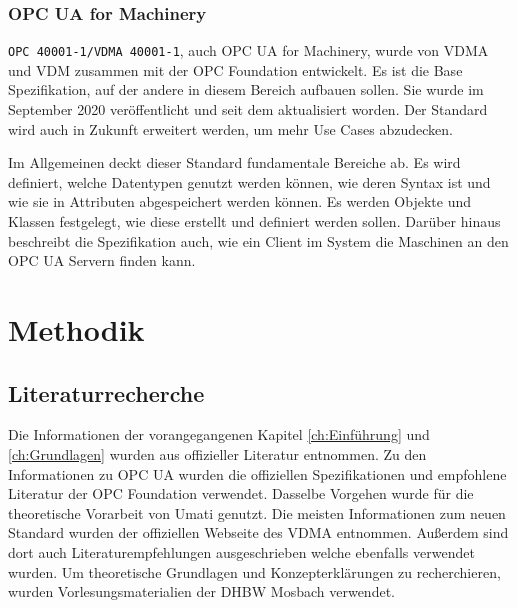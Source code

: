 \documentclass[a4paper, 12pt, oneside]{scrbook}
\begin{document}
		\subsection{OPC UA for Machinery}
		
		\texttt{OPC 40001-1/VDMA 40001-1}, auch OPC UA for Machinery, wurde von VDMA und VDM zusammen mit der OPC Foundation entwickelt. Es ist die Base Spezifikation, auf der andere in diesem Bereich aufbauen sollen. Sie wurde im September 2020 veröffentlicht und seit dem aktualisiert worden. Der Standard wird auch in Zukunft erweitert werden, um mehr Use Cases abzudecken.
		
		Im Allgemeinen deckt dieser Standard fundamentale Bereiche ab. Es wird definiert, welche Datentypen genutzt werden können, wie deren Syntax ist und wie sie in Attributen abgespeichert werden können. Es werden Objekte und Klassen festgelegt, wie diese erstellt und definiert werden sollen. Darüber hinaus beschreibt die Spezifikation auch, wie ein Client im System die Maschinen an den OPC UA Servern finden kann. 

\chapter{Methodik}\label{ch:Methodiken}
	
	
	\section{Literaturrecherche}
	
	Die Informationen der vorangegangenen Kapitel \ref{ch:Einführung} und \ref{ch:Grundlagen} wurden aus offizieller Literatur entnommen. Zu den Informationen zu OPC UA wurden die offiziellen Spezifikationen und empfohlene Literatur der OPC Foundation verwendet. Dasselbe Vorgehen wurde für die theoretische Vorarbeit von Umati genutzt. Die meisten Informationen zum neuen Standard wurden der offiziellen Webseite des VDMA entnommen. Außerdem sind dort auch Literaturempfehlungen ausgeschrieben welche ebenfalls verwendet wurden. Um theoretische Grundlagen und Konzepterklärungen zu recherchieren, wurden Vorlesungsmaterialien der DHBW Mosbach verwendet.
	
	
	
	
	
\end{document}
